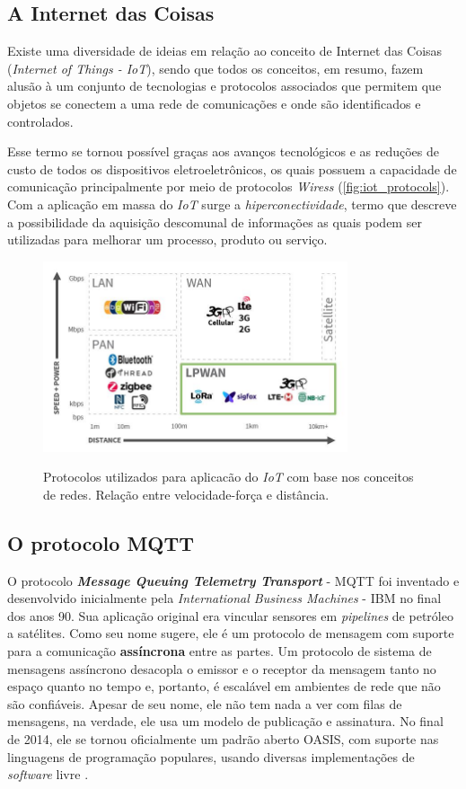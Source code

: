 \subsection{A Internet das Coisas}

Existe uma diversidade de ideias em relação ao conceito de Internet das Coisas (\textit{Internet of Things - IoT}), sendo que todos os conceitos, em resumo, fazem alusão à um conjunto de tecnologias e protocolos associados que permitem que objetos se conectem a uma rede de comunicações e onde são identificados e controlados.

Esse termo se tornou possível graças aos avanços tecnológicos e as reduções de custo de todos os dispositivos eletroeletrônicos, os quais possuem a capacidade de comunicação principalmente por meio de protocolos \textit{Wiress} (\autoref{fig:iot_protocols}). Com a aplicação em massa do \textit{IoT} surge a \textit{hiperconectividade}, termo que descreve a possibilidade da aquisição descomunal de informações as quais podem ser utilizadas para melhorar um processo, produto ou serviço.

\begin{figure}[H]
	\centering
	\caption{Protocolos utilizados para aplicacão do \textit{IoT} com base nos conceitos de redes. Relação entre velocidade-força e distância.}
	\includegraphics[width=0.8\textwidth]{figuras/iotprotocols.jpg}
	\label{fig:iot_protocols}
\end{figure}


\subsection{O protocolo MQTT}

O protocolo \textbf{\textit{Message Queuing Telemetry Transport}} - MQTT foi inventado e desenvolvido inicialmente pela \textit{International Business Machines} - IBM no final dos anos 90. Sua aplicação original era vincular sensores em \textit{pipelines} de petróleo a satélites. Como seu nome sugere, ele é um protocolo de mensagem com suporte para a comunicação \textbf{assíncrona} entre as partes. Um protocolo de sistema de mensagens assíncrono desacopla o emissor e o receptor da mensagem tanto no espaço quanto no tempo e, portanto, é escalável em ambientes de rede que não são confiáveis. Apesar de seu nome, ele não tem nada a ver com filas de mensagens, na verdade, ele usa um modelo de publicação e assinatura. No final de 2014, ele se tornou oficialmente um padrão aberto OASIS, com suporte nas linguagens de programação populares, usando diversas implementações de \textit{software} livre \cite{IBM}.

